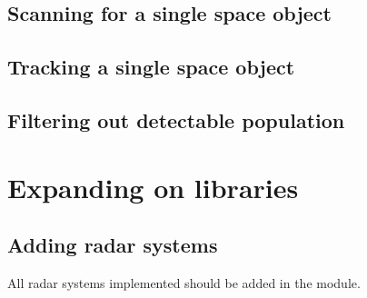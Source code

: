 \documentclass[letterpaper,10pt,english]{sphinxmanual}
\begin{document}
\subsection{Scanning for a single space object}
\label{\detokenize{usage_examples:scanning-for-a-single-space-object}}

\subsection{Tracking a single space object}
\label{\detokenize{usage_examples:tracking-a-single-space-object}}

\subsection{Filtering out detectable population}
\label{\detokenize{usage_examples:filtering-out-detectable-population}}

\section{Expanding on libraries}
\label{\detokenize{usage_examples:expanding-on-libraries}}

\subsection{Adding radar systems}
\label{\detokenize{usage_examples:adding-radar-systems}}
All radar systems implemented should be added in the {\hyperref[\detokenize{modules/radar_library:module-radar_library}]{}} module.
\end{document}
